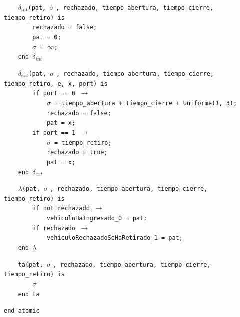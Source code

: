 \documentclass[12pt]{article}
\begin{document}
\begin{tcolorbox}[
    colback=black!5!white,
    colframe=black!80!white,
    boxrule=0.8pt,
    arc=2pt,
    left=5pt,
    right=5pt,
    top=5pt,
    bottom=5pt,
    fontupper=\ttfamily,
    breakable
]
\begin{flushleft}
\texttt{~~~~}$\delta_{int}$\texttt{(pat, }$\sigma$ \texttt{, rechazado, tiempo\_abertura, tiempo\_cierre, tiempo\_retiro) is} \\
\texttt{~~~~~~~~rechazado = false;} \\
\texttt{~~~~~~~~pat = 0;} \\
\texttt{~~~~~~~~}$\sigma$\texttt{ = }\(\infty\)\texttt{;} \\
\texttt{~~~~end }$\delta_{int}$
\end{flushleft}

\begin{flushleft}
\texttt{~~~~}$\delta_{ext}$\texttt{(pat, }$\sigma$ \texttt{, rechazado, tiempo\_abertura, tiempo\_cierre, tiempo\_retiro, e, x, port) is} \\
\texttt{~~~~~~~~if port == 0 }\(\rightarrow\) \\
\texttt{~~~~~~~~~~~~}$\sigma$\texttt{ =  tiempo\_abertura + tiempo\_cierre + Uniforme(1, 3);} \\
\texttt{~~~~~~~~~~~~rechazado = false;} \\
\texttt{~~~~~~~~~~~~pat = x;} \\
\texttt{~~~~~~~~if port == 1 }\(\rightarrow\) \\
\texttt{~~~~~~~~~~~~}$\sigma$\texttt{ = tiempo\_retiro;} \\
\texttt{~~~~~~~~~~~~rechazado = true;} \\
\texttt{~~~~~~~~~~~~pat = x;} \\
\texttt{~~~~end }$\delta_{ext}$
\end{flushleft}

\begin{flushleft}
\texttt{~~~~}$\lambda$\texttt{(pat, }$\sigma$ \texttt{, rechazado, tiempo\_abertura, tiempo\_cierre, tiempo\_retiro) is} \\
\texttt{~~~~~~~~if not rechazado }\(\rightarrow\) \\
\texttt{~~~~~~~~~~~~vehiculoHaIngresado\_0 = pat;} \\
\texttt{~~~~~~~~if rechazado }\(\rightarrow\) \\
\texttt{~~~~~~~~~~~~vehiculoRechazadoSeHaRetirado\_1 = pat;} \\
\texttt{~~~~end }$\lambda$
\end{flushleft}

\begin{flushleft}
\texttt{~~~~ta(pat, }$\sigma$ \texttt{, rechazado, tiempo\_abertura, tiempo\_cierre, tiempo\_retiro) is} \\
\texttt{~~~~~~~~}$\sigma$ \\
\texttt{~~~~end ta}
\end{flushleft}

\begin{flushleft}
\texttt{end atomic}
\end{flushleft}
\end{tcolorbox}
\end{document}
